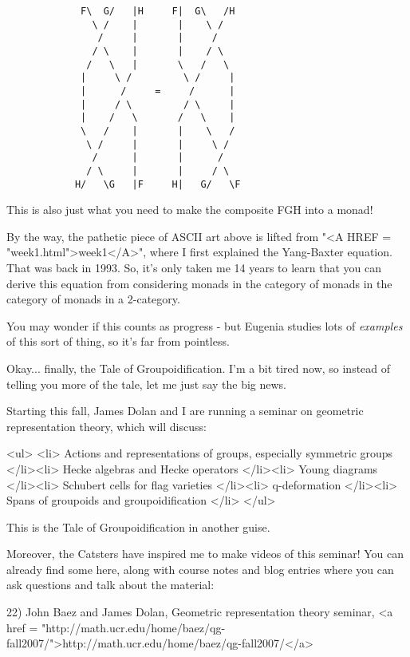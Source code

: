 \begin{verbatim}
             F\  G/   |H     F|  G\   /H
               \ /    |       |    \ /
                /     |       |     /
               / \    |       |    / \
              /   \   |       \   /   \
             |     \ /         \ /     |
             |      /     =     /      | 
             |     / \         / \     |
             |    /   \       /   \    |
             \   /    |       |    \   /
              \ /     |       |     \ /
               /      |       |      /
              / \     |       |     / \
            H/   \G   |F     H|   G/   \F
\end{verbatim}
    

This is also just what you need to make the composite FGH
into a monad!

By the way, the pathetic piece of ASCII art above is lifted 
from "<A HREF = "week1.html">week1</A>", where I first 
explained the Yang-Baxter equation.
That was back in 1993.  So, it's only taken me 14 years to learn
that you can derive this equation from considering monads in
the category of monads in the category of monads in a 2-category.

You may wonder if this counts as progress - but Eugenia
studies lots of \emph{examples} of this sort of thing, so it's far
from pointless.  

Okay... finally, the Tale of Groupoidification.  I'm a bit tired
now, so instead of telling you more of the tale, let me just say
the big news.

Starting this fall, James Dolan and I are running a seminar on
geometric representation theory, which will discuss:

<ul>
<li>
 Actions and representations of groups, especially symmetric groups
</li><li>
 Hecke algebras and Hecke operators
</li><li>
 Young diagrams
</li><li>
 Schubert cells for flag varieties
</li><li>
 q-deformation 
</li><li>
 Spans of groupoids and groupoidification
</li>
</ul>

This is the Tale of Groupoidification in another guise.

Moreover, the Catsters have inspired me to make videos of this 
seminar!  You can already find some here, along with course 
notes and blog entries where you can ask questions and talk about 
the material:

22) John Baez and James Dolan, Geometric representation theory seminar,
<a href = "http://math.ucr.edu/home/baez/qg-fall2007/">http://math.ucr.edu/home/baez/qg-fall2007/</a>


